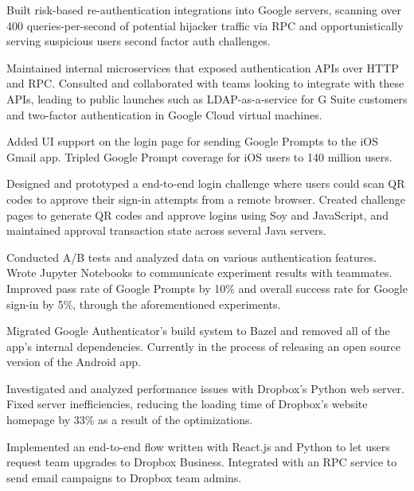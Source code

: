 \documentclass[]{template}
\begin{document}
\hfill
{}
\begin{tightemize}
\item
  Built risk-based re-authentication integrations into Google servers, scanning
  over 400 queries-per-second of potential hijacker traffic via RPC and
  opportunistically serving suspicious users second factor auth challenges.
\item
  Maintained internal microservices that exposed authentication APIs over HTTP
  and RPC. Consulted and collaborated with teams looking to integrate with these
  APIs, leading to public launches such as LDAP-as-a-service for G Suite
  customers and two-factor authentication in Google Cloud virtual machines.
\item
  Added UI support on the login page for sending Google Prompts to the iOS Gmail
  app. Tripled Google Prompt coverage for iOS users to 140 million users.
\item
  Designed and prototyped a end-to-end login challenge where users could scan QR
  codes to approve their sign-in attempts from a remote browser. Created
  challenge pages to generate QR codes and approve logins using Soy and
  JavaScript, and maintained approval transaction state across several Java
  servers.
\item
  Conducted A/B tests and analyzed data on various authentication features.
  Wrote Jupyter Notebooks to communicate experiment results with teammates.
  Improved pass rate of Google Prompts by 10\% and overall success rate for
  Google sign-in by 5\%, through the aforementioned experiments.
\item
  Migrated Google Authenticator's build system to Bazel and removed all of the
  app's internal dependencies. Currently in the process of releasing an open
  source version of the Android app.
\item
\end{tightemize}

\sectionsep

\hfill
{}
\begin{tightemize}
\item
  Investigated and analyzed performance issues with Dropbox's Python web server.
  Fixed server inefficiencies, reducing the loading time of Dropbox's
  website homepage by 33\% as a result of the optimizations.
\item
  Implemented an end-to-end flow written with React.js and Python to let users
  request team upgrades to Dropbox Business. Integrated with an RPC service to
  send email campaigns to Dropbox team admins.
\item
\end{tightemize}
\end{document}
